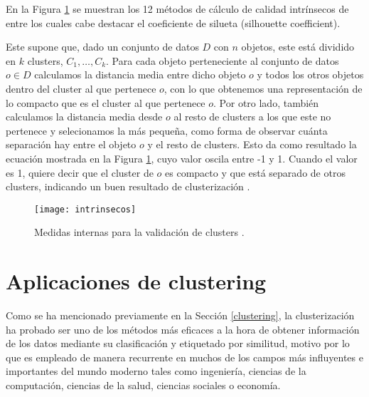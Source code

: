 \documentclass[10pt, a4paper]{article}
\begin{document}
En la Figura \ref{fig:intrinsecos} se muestran los 12 métodos de cálculo de calidad intrínsecos de entre los cuales cabe destacar el coeficiente de silueta (silhouette coefficient).

Este supone que, dado un conjunto de datos $D$ con $n$ objetos, este está dividido en $k$ clusters, $C_1,\ldots,C_k$. Para cada objeto perteneciente al conjunto de datos $o \in D$ calculamos la distancia media entre dicho objeto $o$ y todos los otros objetos dentro del cluster al que pertenece $o$, con lo que obtenemos una representación de lo compacto que es el cluster al que pertenece $o$. Por otro lado, también calculamos la distancia media desde $o$ al resto de clusters a los que este no pertenece y selecionamos la más pequeña, como forma de observar cuánta separación hay entre el objeto $o$ y el resto de clusters. Esto da como resultado la ecuación mostrada en la Figura \ref{fig:intrinsecos}, cuyo valor oscila entre -1 y 1. Cuando el valor es 1, quiere decir que el cluster de $o$ es compacto y que está separado de otros clusters, indicando un buen resultado de clusterización \cite{LIBRO}.


\begin{figure}[ht]
\centering
\texttt{[image: intrinsecos]}
\caption{Medidas internas para la validación de clusters \cite{otrolibro}.}
\label{fig:intrinsecos}
\end{figure}


\section{Aplicaciones de clustering} \label{sec:aplicaciones}

Como se ha mencionado previamente en la Sección \ref{clustering}, la clusterización ha probado ser uno de los métodos más eficaces a la hora de obtener información de los datos mediante su clasificación y etiquetado por similitud, motivo por lo que es empleado de manera recurrente en muchos de los campos más influyentes e importantes del mundo moderno tales como ingeniería, ciencias de la computación, ciencias de la salud, ciencias sociales o economía. 
\end{document}
